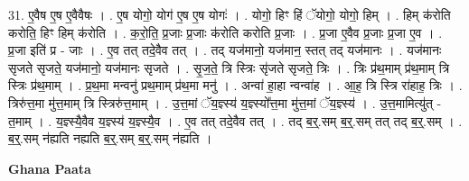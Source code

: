\documentclass[17pt]{extarticle}
\begin{document}
31. ए॒वैष ए॒ष ए॒वैवैषः । . ए॒ष योगो॒ योग॑ ए॒ष ए॒ष योगः॑ । . योगो॒ हिꣳ हिं ॅयोगो॒ योगो॒ हिम् । . हिम् क॑रोति करोति॒ हिꣳ हिम् क॑रोति । . क॒रो॒ति॒ प्र॒जाः प्र॒जाः क॑रोति करोति प्र॒जाः । . प्र॒जा ए॒वैव प्र॒जाः प्र॒जा ए॒व । . प्र॒जा इति॑ प्र - जाः । . ए॒व तत् तदे॒वैव तत् । . तद् यज॑मानो॒ यज॑मान॒ स्तत् तद् यज॑मानः । . यज॑मानः सृजते सृजते॒ यज॑मानो॒ यज॑मानः सृजते । . सृ॒ज॒ते॒ त्रि स्त्रिः सृ॑जते सृजते॒ त्रिः । . त्रिः प्र॑थ॒माम् प्र॑थ॒माम् त्रि स्त्रिः प्र॑थ॒माम् । . प्र॒थ॒मा मन्वनु॑ प्रथ॒माम् प्र॑थ॒मा मनु॑ । . अन्वा॑ हा॒हा न्वन्वा॑ह । . आ॒ह॒ त्रि स्त्रि रा॑हाह॒ त्रिः । . त्रिरु॑त्त॒मा मु॑त्त॒माम् त्रि स्त्रिरु॑त्त॒माम् । . उ॒त्त॒मां ॅय॒ज्ञ्स्य॑ य॒ज्ञ्स्यो᳚त्त॒मा मु॑त्त॒मां ॅय॒ज्ञ्स्य॑ । . उ॒त्त॒मामित्यु॑त् - त॒माम् । . य॒ज्ञ्स्यै॒वैव य॒ज्ञ्स्य॑ य॒ज्ञ्स्यै॒व । . ए॒व तत् तदे॒वैव तत् । . तद् ब॒र्॒.सम् ब॒र्॒.सम् तत् तद् ब॒र्॒.सम् । . ब॒र्॒.सम् न॑ह्यति नह्यति ब॒र्॒.सम् ब॒र्॒.सम् न॑ह्यति । \newline

\textbf{Ghana Paata } \newline
\end{document}
